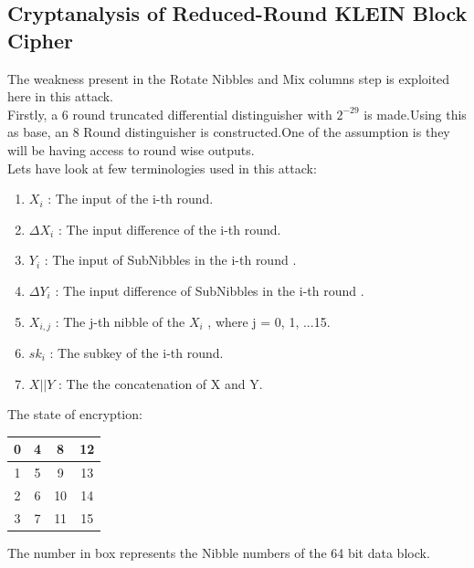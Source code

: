 \documentclass[preprint]{transcrypto}
\begin{document}
\subsection{Cryptanalysis of Reduced-Round KLEIN Block Cipher} \cite{reduced_round}
The weakness present in the Rotate Nibbles and Mix columns step is exploited here in this attack.\\
Firstly, a 6 round truncated differential distinguisher with $2^{-29}$ is made.Using this as base, an 8 Round distinguisher is constructed.One of the assumption is they will be having access to round wise outputs.\\
Lets have look at few terminologies used in this attack:\\
\begin{enumerate}
    \item $X_{i}$ : The input of the i-th round.
    \item $\Delta X_{i}$ : The input difference of the i-th round.
    \item $Y_{i}$ : The input of SubNibbles in the i-th round .
    \item $\Delta Y_{i}$ : The input difference of SubNibbles in the i-th round .
    \item $X_{i,j}$ : The j-th nibble of the $X_{i}$ , where j = 0, 1, ...15.
    \item $sk_{i}$ : The subkey of the i-th round.
    \item $X || Y$ : The the concatenation of X and Y.
\end{enumerate}
The state of encryption: \\
\begin{center}
\begin{tabular}{|c|c|c|c|}
\hline
0&4&8&12\\
\hline
1&5&9&13\\
\hline
2&6&10&14 \\
\hline
3&7&11&15\\  
\hline
\end{tabular}
\end{center}
The number in box represents the Nibble numbers of the 64 bit data block.
\end{document}
